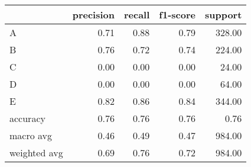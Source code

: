 \begin{tabular}{|l|r|r|r|r|}
\hline
{} &  precision &  recall &  f1-score &  support \\
\hline
A            &       0.71 &    0.88 &      0.79 &   328.00 \\
B            &       0.76 &    0.72 &      0.74 &   224.00 \\
C            &       0.00 &    0.00 &      0.00 &    24.00 \\
D            &       0.00 &    0.00 &      0.00 &    64.00 \\
E            &       0.82 &    0.86 &      0.84 &   344.00 \\
accuracy     &       0.76 &    0.76 &      0.76 &     0.76 \\
macro avg    &       0.46 &    0.49 &      0.47 &   984.00 \\
weighted avg &       0.69 &    0.76 &      0.72 &   984.00 \\
\hline
\end{tabular}
